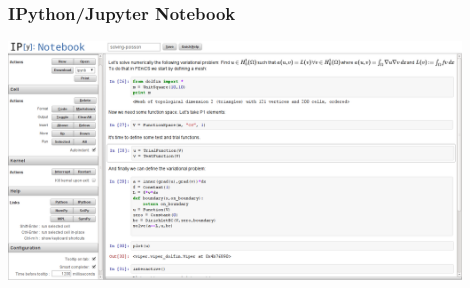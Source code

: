 \begin{frame}
    \frametitle{IPython/Jupyter Notebook}
    \begin{center}
        \includegraphics[width=0.90\textwidth,height=0.8\textheight]{png/solving-poisson-notebook}
    \end{center}
\end{frame}
